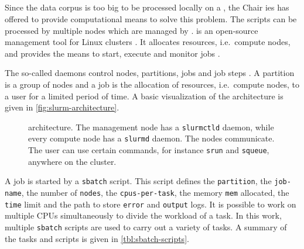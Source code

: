 
\subsection{\slurm{}}\label{subsec:slurm}

Since the data corpus is too big to be processed locally on a \localMaschineStats{}, the Chair \ac{ies} has offered to provide computational means to solve this problem.
The scripts can be processed by multiple nodes which are managed by \slurm{}. 
\slurm{} is an open-source management tool for Linux clusters \cite{slurm-online}.
It allocates resources, i.e.\ compute nodes, and provides the means to start, execute and monitor jobs \cite{slurm-online, slurm2003}.

The so-called \slurm{} daemons control nodes, partitions, jobs and job steps \cite{slurm-online}.
A partition is a group of nodes and a job is the allocation of resources, i.e.\ compute nodes, to a user for a limited period of time.
A basic visualization of the architecture is given in \autoref{fig:slurm-architecture}.

\begin{figure}[!htp] %
    \centering
    
    \caption[\slurm{} architecture]{\slurm{} architecture. The management node has a \texttt{slurmctld} daemon, while every compute node has a \texttt{slurmd} daemon.
    The nodes communicate.
    The user can use certain commands, for instance \texttt{srun} and \texttt{squeue}, anywhere on the cluster.
    }
    \label{fig:slurm-architecture}
\end{figure}

A job is started by a \texttt{sbatch} script.
This script defines the \texttt{partition}, the \texttt{job-name}, the number of \texttt{nodes}, the \texttt{cpus-per-task}, the memory \texttt{mem} allocated, 
the \texttt{time} limit and the path to store \texttt{error} and \texttt{output} logs.
It is possible to work on multiple CPUs simultaneously to divide the workload of a task.
In this work, multiple \texttt{sbatch} scripts are used to carry out a variety of tasks.
A summary of the tasks and scripts is given in \autoref{tbl:sbatch-scripts}.

